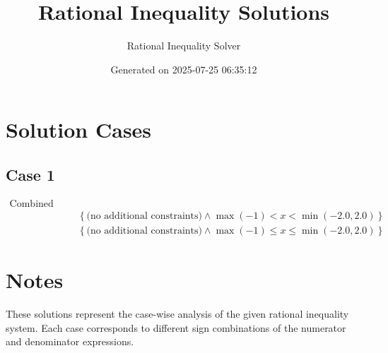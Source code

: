 \documentclass{article}
\title{Rational Inequality Solutions}
\author{Rational Inequality Solver}
\date{Generated on 2025-07-25 06:35:12}
\begin{document}
\maketitle

\section{Solution Cases}

\subsection{Case 1}

\begin{align}
\text{Combined Cases} \\
& \left\{\text{(no additional constraints)} \wedge \max\left(-1\right) < x < \min\left(-2.0, 2.0\right)\right\} \\
& \left\{\text{(no additional constraints)} \wedge \max\left(-1\right) \le x \le \min\left(-2.0, 2.0\right)\right\}
\end{align}


\section{Notes}

These solutions represent the case-wise analysis of the given rational inequality system. Each case corresponds to different sign combinations of the numerator and denominator expressions.
\end{document}
